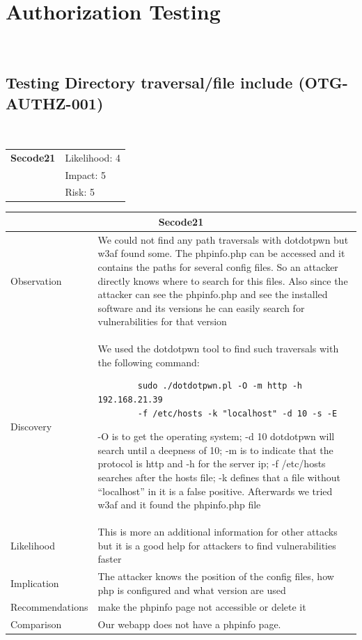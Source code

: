 \documentclass[headsepline,footsepline,footinclude=false,oneside,fontsize=11pt,paper=a4,listof=totoc,bibliography=totoc]{scrbook} %
\begin{document}
\pagebreak
\section{Authorization Testing}\
\subsection{Testing Directory traversal/file include (OTG-AUTHZ-001)}\

\begin{tabular}{cR{12cm}}
	\textbf{Secode21} & Likelihood: 4\\& Impact: 5\\& Risk: 5
\end{tabular}

\begin{tabular}{ l|p{11cm}  }
	\hline
	\multicolumn{2}{c}{\textbf{Secode21}} \\
	\hline
	Observation   & We could not find any path traversals with dotdotpwn but w3af found some.
	The phpinfo.php can be accessed and it contains the paths for several config files. So
	an attacker directly knows where to search for this files. Also since the attacker can see
	the phpinfo.php and see the installed software and its versions he can easily search for vulnerabilities for that version \\
	Discovery  & We used the dotdotpwn tool to find such traversals with the following command:
	\begin{lstlisting}
		sudo ./dotdotpwn.pl -O -m http -h 192.168.21.39
		-f /etc/hosts -k "localhost" -d 10 -s -E
	\end{lstlisting}
	-O is to get the operating system; -d 10 dotdotpwn will search until a deepness of 10;
	-m is to indicate that the protocol is http and -h for the server ip; -f /etc/hosts searches
	after the hosts file; -k defines that a file without ``localhost'' in it is a false positive.
	Afterwards we tried w3af and it found the phpinfo.php file\\
	Likelihood & This is more an additional information for other attacks but it is a
	good help for attackers to find vulnerabilities faster \\
	Implication    & The attacker knows the position of the config files, how php is
	configured and what version are used \\
	Recommendations & make the phpinfo page not accessible or delete it \\
	Comparison & Our webapp does not have a phpinfo page.\\
	\hline
\end{tabular}
\end{document}
